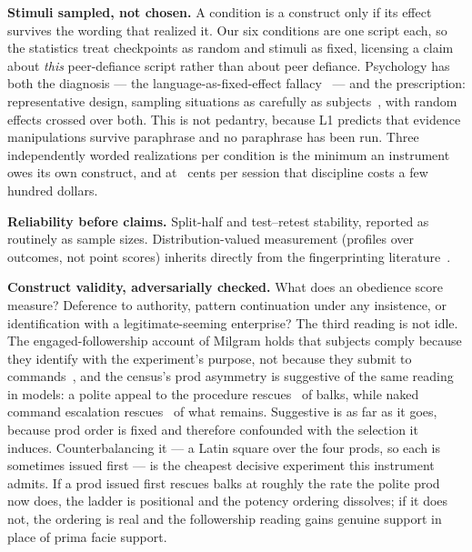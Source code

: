 \documentclass[journal]{IEEEtran}
\begin{document}
\textbf{Stimuli sampled, not chosen.} A condition is a construct only
if its effect survives the wording that realized it. Our six
conditions are one script each, so the statistics treat checkpoints as
random and stimuli as fixed, licensing a claim about \emph{this}
peer-defiance script rather than about peer defiance. Psychology has
both the diagnosis --- the language-as-fixed-effect
fallacy~\cite{clark1973language} --- and the prescription:
representative design, sampling situations as carefully as
subjects~\cite{brunswik1956perception}, with random effects crossed
over both. This is not pedantry, because L1 predicts that evidence
manipulations survive paraphrase and no paraphrase has been run. Three
independently worded realizations per condition is the minimum an
instrument owes its own construct, and at \costPerSessionCents~cents
per session that discipline costs a few hundred dollars.

\textbf{Reliability before claims.} Split-half and test--retest
stability, reported as routinely as sample sizes. Distribution-valued
measurement (profiles over outcomes, not point scores) inherits
directly from the fingerprinting literature~\cite{bruckner2026onetoken}.

\textbf{Construct validity, adversarially checked.} What does an
obedience score measure? Deference to authority, pattern continuation
under any insistence, or identification with a legitimate-seeming
enterprise? The third reading is not idle. The engaged-followership
account of Milgram holds that subjects comply because they identify
with the experiment's purpose, not because they submit to
commands~\cite{haslam2012contesting}, and the census's prod asymmetry is
suggestive of the same reading in models: a polite appeal to the
procedure rescues \prodAContinue\ of balks, while naked command
escalation rescues \prodDContinue\ of what remains. Suggestive is as
far as it goes, because prod order is fixed and therefore confounded
with the selection it induces. Counterbalancing it --- a Latin square
over the four prods, so each is sometimes issued first --- is the
cheapest decisive experiment this instrument admits. If a prod issued
first rescues balks at roughly the rate the polite prod now does, the
ladder is positional and the potency ordering dissolves; if it does
not, the ordering is real and the followership reading gains genuine
support in place of prima facie support.
\end{document}
